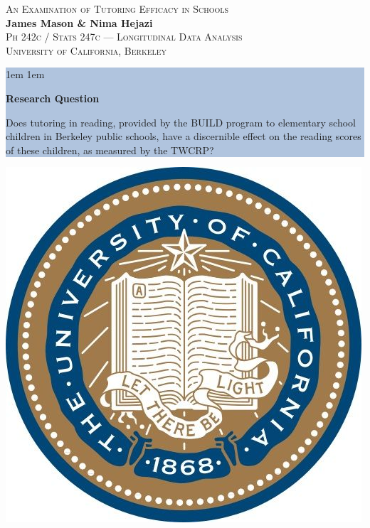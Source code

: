 \documentclass[a0,landscape]{a0poster}
\begin{document}


\begin{minipage}[b]{0.53\linewidth}
\Huge{\color{NavyBlue} \scshape An Examination of Tutoring Efficacy in Schools} \\ %
\huge\textbf{James Mason \& Nima Hejazi}\\ %
\Large{\scshape Ph 242c / Stats 247c --- Longitudinal Data Analysis} \\ %
\LARGE{\scshape University of California, Berkeley}\\ %
\end{minipage}%
%
\colorbox{LightSteelBlue}{\begin{minipage}[b]{0.35\linewidth}
        \vspace{2ex}
        \leftskip 1em \rightskip 1em
        \begin{center}
        {\color{Black} \LARGE \bfseries Research Question}
        \end{center}
          
        \Large
        Does tutoring in reading, provided by the BUILD program
        to elementary school children in Berkeley public schools,
        have a discernible effect on the reading scores of
        these children, as measured by the TWCRP?
        \vspace{2ex}
\end{minipage}}
\hfill
\includegraphics[scale=0.5]{logo_cal.jpg} 
\end{document}
